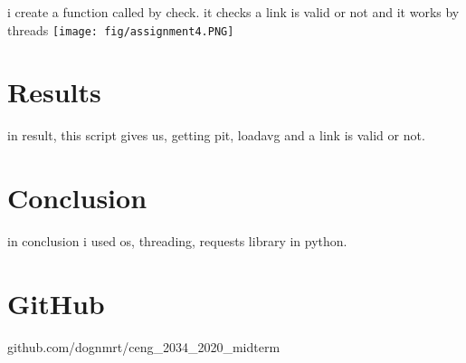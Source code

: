 \documentclass[onecolumn]{article}
\begin{document}
i create a function called by check. it checks a link is valid or not and it works by threads
    \newline
    \texttt{[image: fig/assignment4.PNG]}




\section{Results}
in result, this script gives us, getting pit, loadavg and a link is valid or not.





\section{Conclusion}
in conclusion i used os, threading, requests library in python.

\section{GitHub}
github.com/dognmrt/ceng\_2034\_2020\_midterm
\end{document}
